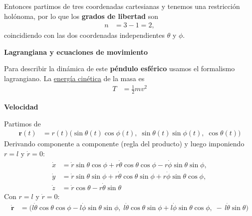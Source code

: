 \documentclass{article}
\begin{document}
Entonces partimos de tres coordenadas cartesianas y tenemos una restricción holónoma, por lo que los
\textbf{grados de libertad} son
\begin{equation}
\begin{split}
n &= 3 - 1 = 2 ,
\end{split}\label{eq:grados-libertad}
\end{equation}
coincidiendo con las dos coordenadas independientes $\theta$ y $\phi$.

\vspace{0.4cm}
\noindent\textbf{Lagrangiana y ecuaciones de movimiento}

Para describir la dinámica de este \textbf{péndulo esférico} usamos el formalismo lagrangiano.  
La \underline{energía cinética} de la masa es
\begin{equation}
\begin{split}
T &= \frac{1}{2}m v^{2}
\end{split}\label{eq:def-T}
\end{equation}

\noindent\textbf{Velocidad}

Partimos de
\begin{equation}
\begin{split}
\mathbf r(t)
&= r(t)\bigl(\sin\theta(t)\cos\phi(t),\;
             \sin\theta(t)\sin\phi(t),\;
             \cos\theta(t)\bigr)
\end{split}\label{eq:r-general}
\end{equation}
Derivando componente a componente (regla del producto) y luego imponiendo $r=l$ y $\dot r=0$:
\begin{equation}
\begin{split}
\dot x &= \dot r\sin\theta\cos\phi
         + r\dot\theta\cos\theta\cos\phi
         - r\dot\phi\sin\theta\sin\phi,\\
\dot y &= \dot r\sin\theta\sin\phi
         + r\dot\theta\cos\theta\sin\phi
         + r\dot\phi\sin\theta\cos\phi,\\
\dot z &= \dot r\cos\theta
         - r\dot\theta\sin\theta 
\end{split}\label{eq:componentes-derivadas}
\end{equation}
Con $r=l$ y $\dot r=0$:
\begin{equation}
\begin{split}
\dot{\mathbf r}
&= \bigl(
l\dot\theta\cos\theta\cos\phi - l\dot\phi\sin\theta\sin\phi,\;
l\dot\theta\cos\theta\sin\phi + l\dot\phi\sin\theta\cos\phi,\;
-\,l\dot\theta\sin\theta
\bigr)
\end{split}\label{eq:r-punto}
\end{equation}
\end{document}
